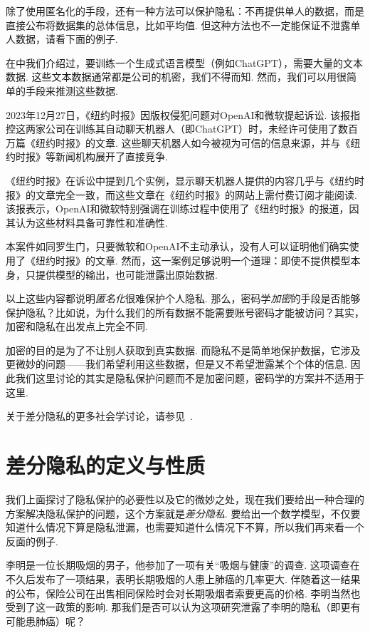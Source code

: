 除了使用匿名化的手段，还有一种方法可以保护隐私：不再提供单人的数据，而是直接公布将数据集的总体信息，比如平均值. 但这种方法也不一定能保证不泄露单人数据，请看下面的例子. 

在中我们介绍过，要训练一个生成式语言模型（例如ChatGPT），需要大量的文本数据. 这些文本数据通常都是公司的机密，我们不得而知. 然而，我们可以用很简单的手段来推测这些数据. 

2023年12月27日，《纽约时报》因版权侵犯问题对OpenAI和微软提起诉讼. 该报指控这两家公司在训练其自动聊天机器人（即ChatGPT）时，未经许可使用了数百万篇《纽约时报》的文章. 这些聊天机器人如今被视为可信的信息来源，并与《纽约时报》等新闻机构展开了直接竞争. 

《纽约时报》在诉讼中提到几个实例，显示聊天机器人提供的内容几乎与《纽约时报》的文章完全一致，而这些文章在《纽约时报》的网站上需付费订阅才能阅读. 该报表示，OpenAI和微软特别强调在训练过程中使用了《纽约时报》的报道，因其认为这些材料具备可靠性和准确性. 

本案件如同罗生门，只要微软和OpenAI不主动承认，没有人可以证明他们确实使用了《纽约时报》的文章. 然而，这一案例足够说明一个道理：即使不提供模型本身，只提供模型的输出，也可能泄露出原始数据.

\begin{remark}
以上这些内容都说明\textit{匿名化}很难保护个人隐私. 那么，密码学\textit{加密}的手段是否能够保护隐私？比如说，为什么我们的所有数据不能需要账号密码才能被访问？其实，加密和隐私在出发点上完全不同. 

加密的目的是为了不让别人获取到真实数据. 而隐私不是简单地保护数据，它涉及更微妙的问题——我们希望利用这些数据，但是又不希望泄露某个个体的信息. 因此我们这里讨论的其实是隐私保护问题而不是加密问题，密码学的方案并不适用于这里.

关于差分隐私的更多社会学讨论，请参见~\cite{kearnsEthicalAlgorithmScience2019}.
\end{remark}

\section{差分隐私的定义与性质}

我们上面探讨了隐私保护的必要性以及它的微妙之处，现在我们要给出一种合理的方案解决隐私保护的问题，这个方案就是\textit{差分隐私}. 要给出一个数学模型，不仅要知道什么情况下算是隐私泄漏，也需要知道什么情况下不算，所以我们再来看一个反面的例子. 

李明是一位长期吸烟的男子，他参加了一项有关“吸烟与健康”的调查. 这项调查在不久后发布了一项结果，表明长期吸烟的人患上肺癌的几率更大. 伴随着这一结果的公布，保险公司在出售相同保险时会对长期吸烟者索要更高的价格. 李明当然也受到了这一政策的影响. 那我们是否可以认为这项研究泄露了李明的隐私（即更有可能患肺癌）呢？


